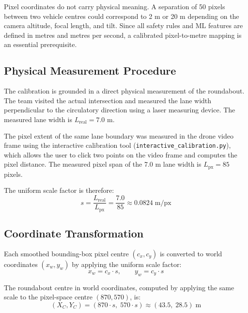 Pixel coordinates do not carry physical meaning.  A separation of 50 pixels between two
vehicle centres could correspond to 2 m or 20 m depending on the camera altitude, focal
length, and tilt.  Since all safety rules and ML features are defined in metres and metres
per second, a calibrated pixel-to-metre mapping is an essential prerequisite.

\subsection{Physical Measurement Procedure}

The calibration is grounded in a direct physical measurement of the roundabout.  The team
visited the actual intersection and measured the lane width perpendicular to the
circulatory direction using a laser measuring device.  The measured lane width is
$L_{\text{real}} = 7.0$ m.

The pixel extent of the same lane boundary was measured in the drone video frame using the
interactive calibration tool (\texttt{interactive\_calibration.py}), which allows the user
to click two points on the video frame and computes the pixel distance.  The measured
pixel span of the 7.0 m lane width is $L_{\text{px}} = 85$ pixels.

The uniform scale factor is therefore:
\begin{equation}
    s = \frac{L_{\text{real}}}{L_{\text{px}}} = \frac{7.0}{85} \approx 0.0824\;\text{m/px}
    \label{eq:scale}
\end{equation}

\subsection{Coordinate Transformation}

Each smoothed bounding-box pixel centre $(c_x, c_y)$ is converted to world coordinates
$(x_w, y_w)$ by applying the uniform scale factor:
\begin{equation}
    x_w = c_x \cdot s, \qquad y_w = c_y \cdot s
    \label{eq:world}
\end{equation}

The roundabout centre in world coordinates, computed by applying the same scale to the
pixel-space centre $(870, 570)$, is:
\begin{equation}
    (X_C, Y_C) = (870 \cdot s,\; 570 \cdot s) \approx (43.5,\; 28.5)\;\text{m}
    \label{eq:centre}
\end{equation}

